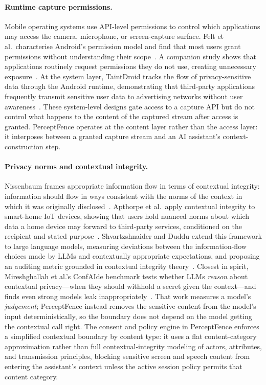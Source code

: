 \documentclass[pdflatex,sn-mathphys-num]{sn-jnl}
\begin{document}
\paragraph{Runtime capture permissions.}
Mobile operating systems use API-level permissions to control which
applications may access the camera, microphone, or screen-capture surface.
Felt et al.\ characterise Android's permission model and find that most users
grant permissions without understanding their scope~\cite{felt2012permissions}.
A companion study shows that applications routinely request permissions they do
not use, creating unnecessary exposure~\cite{felt2011android}.
At the system layer, TaintDroid tracks the flow of privacy-sensitive data
through the Android runtime, demonstrating that third-party applications
frequently transmit sensitive user data to advertising networks without user
awareness~\cite{enck2014taintdroid}.
These system-level designs gate access to a capture API but do not control
what happens to the content of the captured stream after access is granted.
PerceptFence operates at the content layer rather than the access layer: it
interposes between a granted capture stream and an AI assistant's
context-construction step.

\paragraph{Privacy norms and contextual integrity.}
Nissenbaum frames appropriate information flow in terms of contextual
integrity: information should flow in ways consistent with the norms of the
context in which it was originally disclosed~\cite{nissenbaum2004privacy}.
Apthorpe et al.\ apply contextual integrity to smart-home IoT devices, showing
that users hold nuanced norms about which data a home device may forward to
third-party services, conditioned on the recipient and stated
purpose~\cite{apthorpe2018smart}.
Shvartzshnaider and Duddu extend this framework to large language models,
measuring deviations between the information-flow choices made by LLMs and
contextually appropriate expectations, and proposing an auditing metric
grounded in contextual integrity theory~\cite{shvartzshnaider2026privacy}.
Closest in spirit, Mireshghallah et al.'s ConfAIde benchmark tests whether LLMs
\textit{reason} about contextual privacy---when they should withhold a secret
given the context---and finds even strong models leak
inappropriately~\cite{mireshghallah2024confaide}. That work measures a model's
\textit{judgement}; PerceptFence instead removes the sensitive content from the
model's input deterministically, so the boundary does not depend on the model
getting the contextual call right.
The consent and policy engine in PerceptFence enforces a simplified contextual
boundary by content type: it uses a flat content-category approximation rather
than full contextual-integrity modeling of actors, attributes, and transmission
principles, blocking sensitive screen and speech content from entering the
assistant's context unless the active session policy permits that content
category.
\end{document}
